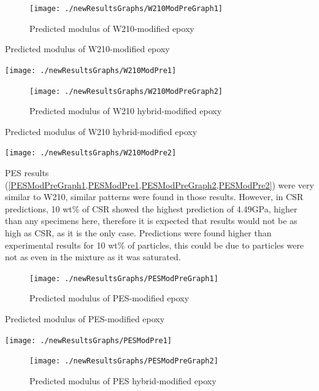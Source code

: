 \documentclass[numbers=noendperiod,chapterprefix=on]{icldt} %
\begin{document}
{\begin{figure}[!hp]
\centering
\texttt{[image: ./newResultsGraphs/W210ModPreGraph1]}
\caption{Predicted modulus of W210-modified epoxy}
\label{W210ModPreGraph1}
\end{figure}
\FloatBarrier

\begin{table}[!htpb]
\centering
\caption{Predicted modulus of W210-modified epoxy} \label{W210ModPre1}
\texttt{[image: ./newResultsGraphs/W210ModPre1]}
\end{table}
\FloatBarrier

\begin{figure}[!t]
\centering
\texttt{[image: ./newResultsGraphs/W210ModPreGraph2]}
\caption{Predicted modulus of W210 hybrid-modified epoxy}
\label{W210ModPreGraph2}
\end{figure}
\FloatBarrier

\begin{table}[!hp]
\centering
\caption{Predicted modulus of W210 hybrid-modified epoxy} \label{W210ModPre2}
\texttt{[image: ./newResultsGraphs/W210ModPre2]}
\end{table}
\FloatBarrier

PES results (\ref{PESModPreGraph1,PESModPre1,PESModPreGraph2,PESModPre2}) were very similar to W210, similar patterns were found in those results. However, in CSR predictions, 10 wt\% of CSR showed the highest prediction of 4.49GPa, higher than any specimens here, therefore it is expected that results would not be as high as CSR, as it is the only case. Predictions were found higher than experimental results for 10 wt\% of particles, this could be due to particles were not as even in the mixture as it was saturated.

\begin{figure}[!t]
\centering
\texttt{[image: ./newResultsGraphs/PESModPreGraph1]}
\caption{Predicted modulus of PES-modified epoxy}\label{PESModPreGraph1}
\end{figure}
\FloatBarrier

\begin{table}[!htpb]
\centering
\caption{Predicted modulus of PES-modified epoxy} \label{PESModPre1}
\texttt{[image: ./newResultsGraphs/PESModPre1]}
\end{table}
\FloatBarrier

\begin{figure}[!hp]
\centering
\texttt{[image: ./newResultsGraphs/PESModPreGraph2]}
\caption{Predicted modulus of PES hybrid-modified epoxy}\label{PESModPreGraph2}
\end{figure}


}
\end{document}
